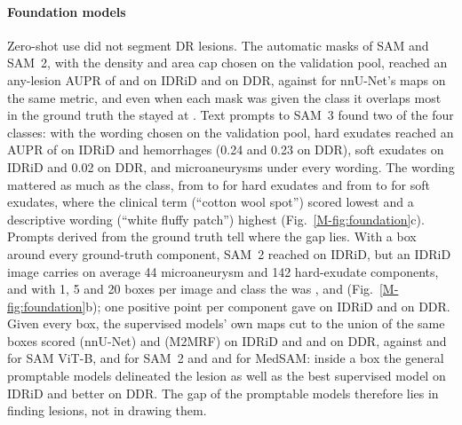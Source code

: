 \paragraph{Foundation models}

Zero-shot use did not segment DR lesions. The automatic masks of SAM and SAM~2, with the density and area cap chosen on the validation pool, reached an any-lesion AUPR of  and  on IDRiD and  on DDR, against  for nnU-Net's maps on the same metric, and even when each mask was given the class it overlaps most in the ground truth the \mAUPR{} stayed at . Text prompts to SAM~3 found two of the four classes: with the wording chosen on the validation pool, hard exudates reached an AUPR of  on IDRiD and hemorrhages  (0.24 and 0.23 on DDR), soft exudates  on IDRiD and 0.02 on DDR, and microaneurysms  under every wording. The wording mattered as much as the class, from  to  for hard exudates and from  to  for soft exudates, where the clinical term (``cotton wool spot'') scored lowest and a descriptive wording (``white fluffy patch'') highest (Fig.~\ref{M-fig:foundation}c). Prompts derived from the ground truth tell where the gap lies. With a box around every ground-truth component, SAM~2 reached  \mAUPR{} on IDRiD, but an IDRiD image carries on average 44 microaneurysm and 142 hard-exudate components, and with 1, 5 and 20 boxes per image and class the \mAUPR{} was ,  and  (Fig.~\ref{M-fig:foundation}b); one positive point per component gave  on IDRiD and  on DDR. Given every box, the supervised models' own maps cut to the union of the same boxes scored  (nnU-Net) and  (M2MRF) on IDRiD and  and  on DDR, against  and  for SAM ViT-B,  and  for SAM~2 and  and  for MedSAM: inside a box the general promptable models delineated the lesion as well as the best supervised model on IDRiD and better on DDR. The gap of the promptable models therefore lies in finding lesions, not in drawing them.

